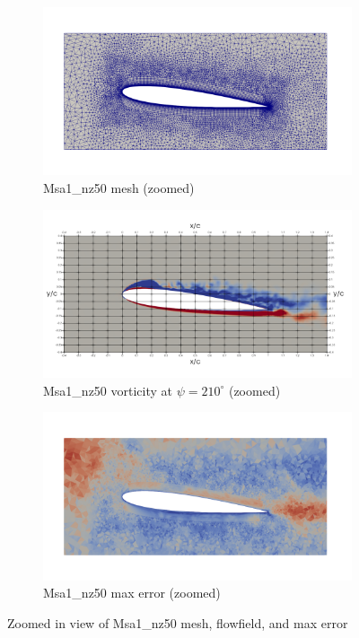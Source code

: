 \begin{figure}[H]
	\centering
	\begin{subfigure}[b]{0.7\textwidth}
		\centering
		\includegraphics[width=1\textwidth]{figures/adapt_strat/zoomed/Msa1_mesh.png}
		\caption{Msa1\_nz50 mesh (zoomed)}
		\label{fig:Msa1_mesh_zoomed}
	\end{subfigure}
	\begin{subfigure}[b]{0.7\textwidth}
		\centering
		\includegraphics[width=1\textwidth]{figures/adapt_strat/zoomed/Msa1_ph_210.png}
		\caption{Msa1\_nz50 vorticity at $\psi=210^\circ$ (zoomed)}
		\label{fig:Msa1_vorticity_zoomed}
	\end{subfigure}
	\begin{subfigure}[b]{0.7\textwidth}
		\centering
		\includegraphics[width=1\textwidth]{figures/adapt_strat/zoomed/Msa1_max_error.png}
		\caption{Msa1\_nz50 max error (zoomed)}
		\label{fig:Msa1_max_error_zoomed}
	\end{subfigure}
	
	
	\label{fig:Msa1_zoomed}
	\caption{Zoomed in view of Msa1\_nz50 mesh, flowfield, and max error}
\end{figure}


